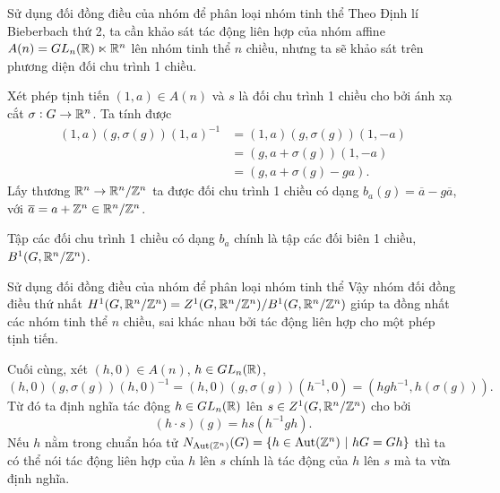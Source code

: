 \begin{frame}{Sử dụng đối đồng điều của nhóm để phân loại nhóm tinh thể}
    Theo Định lí Bieberbach thứ 2, ta cần khảo sát tác động liên hợp của nhóm affine $A(n) = GL_n(\mathbb R) \ltimes \mathbb R^n$ lên nhóm tinh thể $n$ chiều, nhưng ta sẽ khảo sát trên phương diện đối chu trình 1 chiều.

    Xét phép tịnh tiến $(1,a) \in A(n)$ và $s$ là đối chu trình 1 chiều cho bởi ánh xạ cắt $\sigma: G \rightarrow \mathbb R^n$. Ta tính được
    \begin{align*}
        (1,a)(g, \sigma(g))(1,a)^{-1} &= (1,a)(g, \sigma(g))(1,-a)\\
        &= (g, a + \sigma(g))(1,-a)\\
        &= (g, a + \sigma(g) - ga).
    \end{align*}
    Lấy thương $\mathbb R^n \rightarrow \mathbb R^n / \mathbb Z^n$ ta được đối chu trình 1 chiều có dạng $b_a(g) = \overline{a} - g\overline{a}$, với $\overline{a} = a + \mathbb Z^n \in \mathbb R^n / \mathbb Z^n$.
    \begin{proposition}
        Tập các đối chu trình 1 chiều có dạng $b_a$ chính là tập các đối biên 1 chiều, $B^1(G, \mathbb R^n / \mathbb Z^n)$.
    \end{proposition}
\end{frame}

\begin{frame}{Sử dụng đối đồng điều của nhóm để phân loại nhóm tinh thể}
    Vậy nhóm đối đồng điều thứ nhất $H^1(G, \mathbb R^n / \mathbb Z^n) = Z^1(G,\mathbb R^n / \mathbb Z^n) / B^1(G, \mathbb R^n / \mathbb Z^n)$ giúp ta đồng nhất các nhóm tinh thể $n$ chiều, sai khác nhau bởi tác động liên hợp cho một phép tịnh tiến.

    Cuối cùng, xét $(h,0) \in A(n)$, $h \in GL_n(\mathbb R)$,
    $$
        (h,0)(g,\sigma(g))(h,0)^{-1} = (h,0)(g, \sigma(g))(h^{-1}, 0) = (hgh^{-1},h(\sigma(g))).
    $$
    Từ đó ta định nghĩa tác động $h \in GL_n(\mathbb R)$ lên $s \in Z^1(G, \mathbb R^n / \mathbb Z^n)$ cho bởi
    $$
        (h \cdot s)(g) = hs(h^{-1}gh).
    $$
    Nếu $h$ nằm trong chuẩn hóa tử $N_{\operatorname{Aut}(\mathbb Z^n)}(G) = \{ h \in \operatorname{Aut}(\mathbb Z^n)\ |\ hG = Gh\}$ thì ta có thể nói tác động liên hợp của $h$ lên $s$ chính là tác động của $h$ lên $s$ mà ta vừa định nghĩa.
\end{frame}

